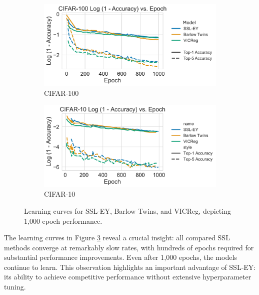 \begin{figure}[H]
    \begin{subfigure}[b]{0.48\textwidth}
        \centering
        \includegraphics[width=\textwidth]{figures/SSL/cifar100_learning_curve_log_error}
        \caption{CIFAR-100}
        \label{fig:ssl_learning_curve_cifar100}
    \end{subfigure}
    \hfill
    \begin{subfigure}[b]{0.48\textwidth}
        \centering
        \includegraphics[width=\textwidth]{figures/SSL/cifar10_learning_curve_log_error}
        \caption{CIFAR-10}
        \label{fig:ssl_learning_curve_cifar10}
    \end{subfigure}
    \caption{Learning curves for SSL-EY, Barlow Twins, and VICReg, depicting 1,000-epoch performance.}
    \label{fig:ssl_learning_curve}
\end{figure}

The learning curves in Figure \ref{fig:ssl_learning_curve} reveal a crucial insight: all compared SSL methods converge at remarkably slow rates, with hundreds of epochs required for substantial performance improvements. Even after 1,000 epochs, the models continue to learn. This observation highlights an important advantage of SSL-EY: its ability to achieve competitive performance without extensive hyperparameter tuning.

